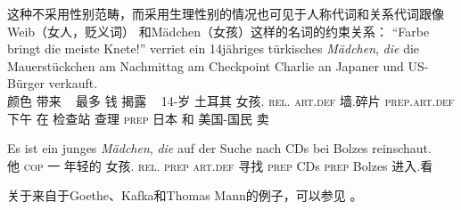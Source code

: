 \zl
这种不采用性别范畴，而采用生理性别的情况也可见于人称代词和关系代词跟像Weib（女人，贬义词） 和Mädchen（女孩）这样的名词的约束关系：
\eal
\ex 
\gll "`Farbe bringt die meiste Knete!"' verriet ein 14jähriges türkisches \emph{Mädchen}, \emph{die} die Mauerstückchen am      Nachmittag am Checkpoint Charlie an Japaner und US-Bürger verkauft.\footnotemark\\
颜色 带来 \deter~ 最多 钱 揭露 \deter~ 14-岁  土耳其 女孩.\neu{} \textsc{rel}.\fem{} \textsc{art}.\textsc{def} 墙.碎片
\textsc{prep}.\textsc{art}.\textsc{def} 下午 在 检查站 查理 \textsc{prep} 日本 和 美国-国民 卖\\  
\ex 
{\raggedright
\gll Es ist ein junges {\em Mädchen\/}, {\em die\/} auf der Suche nach CDs bei Bolzes reinschaut.\footnotemark\\
	 他 \textsc{cop} 一 年轻的 女孩.\neu{} \textsc{rel}.\fem{} \textsc{prep} \textsc{art}.\textsc{def} 寻找 \textsc{prep} CDs \textsc{prep} Bolzes 进入.看\\
\par}
\zl
关于来自于Goethe、Kafka和Thomas Mann的例子，可以参见 。

